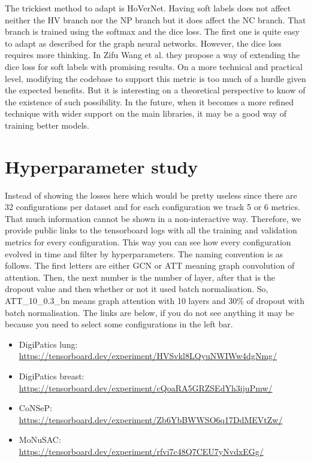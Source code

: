 The trickiest method to adapt is HoVerNet. Having soft labels does not affect neither the HV branch nor the NP branch but it does affect the NC branch. That branch is trained using the softmax and the dice loss. The first one is quite easy to adapt as described for the graph neural networks. However, the dice loss requires more thinking. In Zifu Wang et al. \cite{wang2023dice} they propose a way of extending the dice loss for soft labels with promising results. On a more technical and practical level, modifying the codebase to support this metric is too much of a hurdle given the expected benefits. But it is interesting on a theoretical perspective to know of the existence of such possibility. In the future, when it becomes a more refined technique with wider support on the main libraries, it may be a good way of training better models.

\chapter{Hyperparameter study}\label{chap:hyper}

Instead of showing the losses here which would be pretty useless since there are 32 configurations per dataset and for each configuration we track 5 or 6 metrics. That much information cannot be shown in a non-interactive way. Therefore, we provide public links to the tensorboard logs with all the training and validation metrics for every configuration. This way you can see how every configuration evolved in time and filter by hyperparameters. The naming convention is as follows. The first letters are either GCN or ATT meaning graph convolution of attention. Then, the next number is the number of layer, after that is the dropout value and then whether or not it used batch normalisation. So, ATT\_10\_0.3\_bn means graph attention with 10 layers and 30\% of dropout with batch normalisation. The links are below, if you do not see anything it may be because you need to select some configurations in the left bar.

\begin{itemize}
    \item DigiPatics lung: \url{https://tensorboard.dev/experiment/HVSvkl8LQyuNWIWw4dgNmg/} 
    \item DigiPatics breast: \url{https://tensorboard.dev/experiment/cQoaRA5GRZSEdYh3ijuPmw/}
    \item CoNSeP: \url{https://tensorboard.dev/experiment/Zb6YbBWWSO6q17DdMEVtZw/}
    \item MoNuSAC: \url{https://tensorboard.dev/experiment/rfvi7c48Q7CEU7yNvdxEGg/}
\end{itemize}

